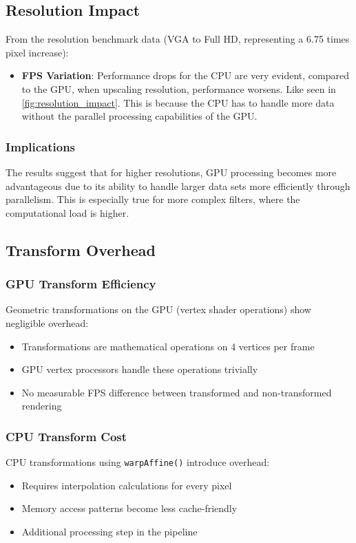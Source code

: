\documentclass[12pt,a4paper]{article}
\begin{document}
\subsection{Resolution Impact}
From the resolution benchmark data (VGA to Full HD, representing a 6.75 times pixel increase):
\begin{itemize}
    \item \textbf{FPS Variation}: Performance drops for the CPU are very evident, compared to the GPU, when upscaling resolution, performance worsens. Like seen in \ref{fig:resolution_impact}. This is because the CPU has to handle more data without the parallel processing capabilities of the GPU.
\end{itemize}

\subsubsection{Implications}
The results suggest that for higher resolutions, GPU processing becomes more advantageous due to its ability to handle larger data sets more efficiently through parallelism. This is especially true for more complex filters, where the computational load is higher. 

\subsection{Transform Overhead}
\subsubsection{GPU Transform Efficiency}
Geometric transformations on the GPU (vertex shader operations) show negligible overhead:
\begin{itemize}
    \item Transformations are mathematical operations on 4 vertices per frame
    \item GPU vertex processors handle these operations trivially
    \item No measurable FPS difference between transformed and non-transformed rendering
\end{itemize}

\subsubsection{CPU Transform Cost}
CPU transformations using \texttt{warpAffine()} introduce overhead:
\begin{itemize}
    \item Requires interpolation calculations for every pixel
    \item Memory access patterns become less cache-friendly
    \item Additional processing step in the pipeline
\end{itemize}
\end{document}
